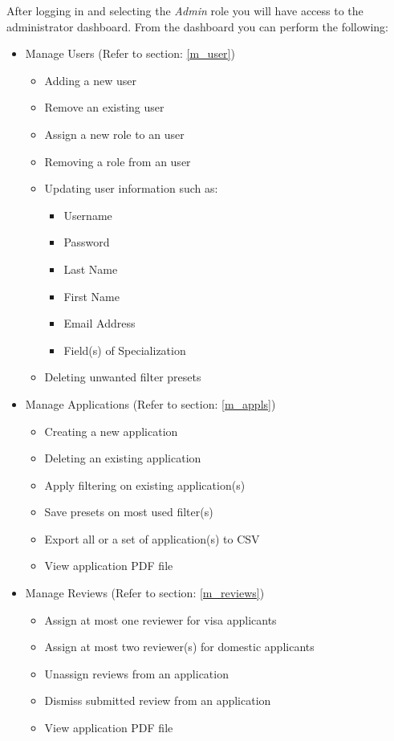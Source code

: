\documentclass[fontsize=12pt,paper=letter,twoside]{scrartcl}
\begin{document}
After logging in and selecting the \emph{Admin} role you will have access to the administrator dashboard. From the dashboard you can perform the following:
\begin{itemize}
\item Manage Users (Refer to section: \ref{m_user})
\begin{itemize}
\item Adding a new user
\item Remove an existing user
\item Assign a new role to an user
\item Removing a role from an user
\item Updating user information such as:
\begin{itemize}
\item Username
\item Password
\item Last Name
\item First Name
\item Email Address
\item Field(s) of Specialization
\end{itemize}
\item Deleting unwanted filter presets
\end{itemize}
\item Manage Applications (Refer to section: \ref{m_appls})
\begin{itemize}
\item Creating a new application
\item Deleting an existing application
\item Apply filtering on existing application(s)
\item Save presets on most used filter(s)
\item Export all or a set of application(s) to CSV
\item View application PDF file
\end{itemize}
\item Manage Reviews (Refer to section: \ref{m_reviews})
\begin{itemize}
\item Assign at most one reviewer for visa applicants
\item Assign at most two reviewer(s) for domestic applicants
\item Unassign reviews from an application
\item Dismiss submitted review from an application
\item View application PDF file
\end{itemize}
\end{itemize} 
\end{document}
